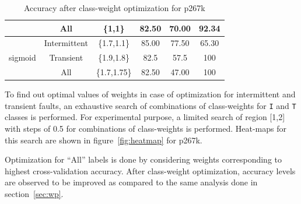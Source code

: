 \begin{table}[h]
\begin{tabular}{cccccc}
                            & All                               & \{1,1\}                                           & 82.50          & 70.00           & 92.34                        \\
\hline
\multirow{3}{*}{sigmoid}    & Intermittent                            & \{1.7,1.1\}                                       & 85.00          & 77.50           & 65.30                      \\
                            & Transient                               & \{1.9,1.8\}                                       & 82.5           & 57.5            & 100                       \\

                            & All                               & \{1.7,1.75\}                                           & 82.50          & 47.00           & 100                        \\
\hline
\end{tabular}
\caption{Accuracy after class-weight optimization for p267k}
\label{tab:optp267k}
\end{table}

To find out optimal values of weights in case of optimization for intermittent and transient faults, an exhaustive search of combinations of class-weights for \texttt{I} and \texttt{T} classes is performed. For experimental purpose, a limited search of region [1,2] with steps of 0.5 for combinations of class-weights is performed. Heat-maps for this search are shown in figure~\ref{fig:heatmap} for p267k.

Optimization for \enquote{All} labels is done by considering weights corresponding to highest cross-validation accuracy. After class-weight optimization, accuracy levels are observed to be improved as compared to the same analysis done in section~\ref{sec:wp}.


